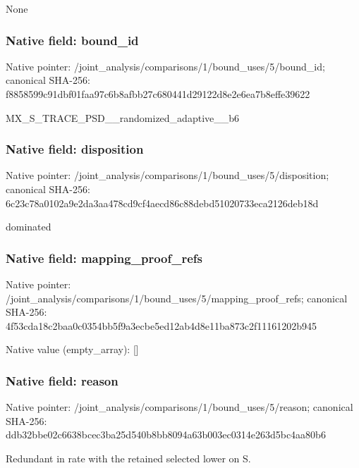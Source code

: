 \documentclass[10pt,a4paper]{article}
\begin{document}
\begingroup\raggedright\sloppy None\par\endgroup

\subsubsection{Native field: bound\_\allowbreak{}id}
Native pointer: /joint\_\allowbreak{}analysis/comparisons/1/bound\_\allowbreak{}uses/5/bound\_\allowbreak{}id; canonical SHA-256: f8858599c91dbf01faa97c6b8afbb27c680441d29122d8e2e6ea7b8effe39622

\begingroup\raggedright\sloppy MX\_\allowbreak{}S\_\allowbreak{}TRACE\_\allowbreak{}PSD\_\allowbreak{}\_\allowbreak{}randomized\_\allowbreak{}adaptive\_\allowbreak{}\_\allowbreak{}b6\par\endgroup

\subsubsection{Native field: disposition}
Native pointer: /joint\_\allowbreak{}analysis/comparisons/1/bound\_\allowbreak{}uses/5/disposition; canonical SHA-256: 6c23c78a0102a9e2da3aa478cd9cf4aecd86c88debd51020733eca2126deb18d

\begingroup\raggedright\sloppy dominated\par\endgroup

\subsubsection{Native field: mapping\_\allowbreak{}proof\_\allowbreak{}refs}
Native pointer: /joint\_\allowbreak{}analysis/comparisons/1/bound\_\allowbreak{}uses/5/mapping\_\allowbreak{}proof\_\allowbreak{}refs; canonical SHA-256: 4f53cda18c2baa0c0354bb5f9a3ecbe5ed12ab4d8e11ba873c2f11161202b945

Native value (empty\_\allowbreak{}array): []

\subsubsection{Native field: reason}
Native pointer: /joint\_\allowbreak{}analysis/comparisons/1/bound\_\allowbreak{}uses/5/reason; canonical SHA-256: ddb32bbe02c6638bcec3ba25d540b8bb8094a63b003ec0314e263d5bc4aa80b6

\begingroup\raggedright\sloppy Redundant in rate with the retained selected lower on S.\par\endgroup
\end{document}
